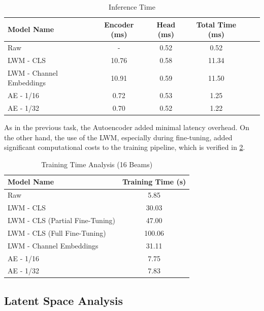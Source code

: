 \begin{table}[htbp]
    \centering
    \caption{Inference Time}
    \label{tab:latency_analysis_beam_selection}
    \begin{tabular}{lccccc}
        \hline
        \textbf{Model Name} & \textbf{Encoder (ms)} & \textbf{Head (ms)} & \textbf{Total Time (ms)} \\
        \hline
        Raw & - & 0.52 & 0.52 \\
        LWM - CLS & 10.76 & 0.58 & 11.34 \\
        LWM - Channel Embeddings & 10.91 & 0.59 & 11.50 \\
        AE - 1/16 & 0.72 & 0.53 & 1.25 \\
        AE - 1/32 & 0.70 & 0.52 & 1.22 \\
        \hline
    \end{tabular}
\end{table}

As in the previous task, the Autoencoder added minimal latency overhead. On the other hand, the use of the LWM, especially during fine-tuning, added significant computational costs to the training pipeline, which is verified in \ref{tab:training_analysis_beam_selection}.

\begin{table}[htbp]
    \centering
    \caption{Training Time Analysis (16 Beams)}
    \label{tab:training_analysis_beam_selection}
    \begin{tabular}{lc}
        \hline
        \textbf{Model Name} & \textbf{Training Time (s)} \\
        \hline
        Raw & 5.85 \\
        LWM - CLS & 30.03 \\
        LWM - CLS (Partial Fine-Tuning) & 47.00 \\
        LWM - CLS (Full Fine-Tuning) & 100.06 \\
        LWM - Channel Embeddings & 31.11 \\
        AE - 1/16 & 7.75 \\
        AE - 1/32 & 7.83 \\
        \hline
    \end{tabular}
\end{table}

\subsection{Latent Space Analysis}\label{sec:experiments_beam_latent}

